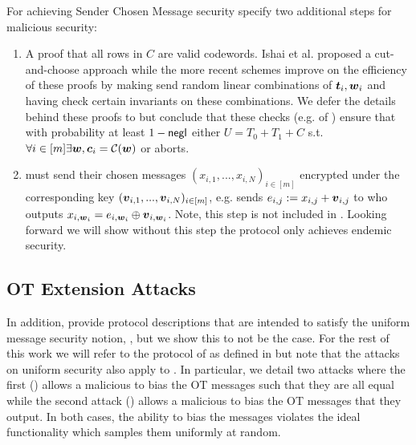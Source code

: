 For achieving Sender Chosen Message security \cite{C:IKNP03,EC:ALSZ15,C:KelOrsSch15,RSA:OrrOrsSch17} specify two additional steps for malicious security:
\begin{enumerate}

	\item A proof that all rows in $C$ are valid codewords. Ishai et al. \cite{C:IKNP03} proposed a cut-and-choose approach while the more recent schemes \cite{C:KelOrsSch15,RSA:OrrOrsSch17} improve on the efficiency of these proofs by making \rec send random linear combinations of $\boldsymbol{t}_i,\boldsymbol{w}_i$ and having \send check certain invariants on these combinations. We defer the details behind these proofs to \cite{C:KelOrsSch15,RSA:OrrOrsSch17} but conclude that these checks (e.g.  of ) ensure that with probability at least $1-\mathsf{negl}$ either $U=T_0+T_1+C$ s.t. $\forall i\in [m] \exists \boldsymbol{w}, \boldsymbol{c}_i=\mathcal{C}(\boldsymbol{w})$ or \send aborts.
	
	\item \send must send their chosen messages $(x_{i,1},...,x_{i,N})_{i\in [m]}$ encrypted under the corresponding key $(\boldsymbol{v}_{i,1},...,\boldsymbol{v}_{i,N})_{i\in [m]}$, e.g. \send sends $e_{i,j}:=x_{i,j}+\boldsymbol{v}_{i,j}$ to \rec who outputs $x_{i,\boldsymbol{w}_i}=e_{i,\boldsymbol{w}_i}\oplus\boldsymbol{v}_{i,\boldsymbol{w}_i}$. Note, this step is not included in . Looking forward we will show without this step the protocol only achieves endemic security.
	
\end{enumerate}


\subsection{OT Extension Attacks}

In addition, \cite{C:KelOrsSch15,RSA:OrrOrsSch17} provide protocol descriptions that are intended to satisfy the uniform message security notion, , but we show this to not be the case. For the rest of this work we will refer to the protocol of \cite{RSA:OrrOrsSch17} as defined in  but note that the attacks on uniform security also apply to \cite[Figure 6, 7]{C:KelOrsSch15}. In particular, we detail two attacks where the first () allows a malicious \send to bias the OT messages such that they are all equal while the second attack () allows a malicious \rec to bias the OT messages that they output. In both cases, the ability to bias the messages violates the ideal functionality which samples them uniformly at random.


